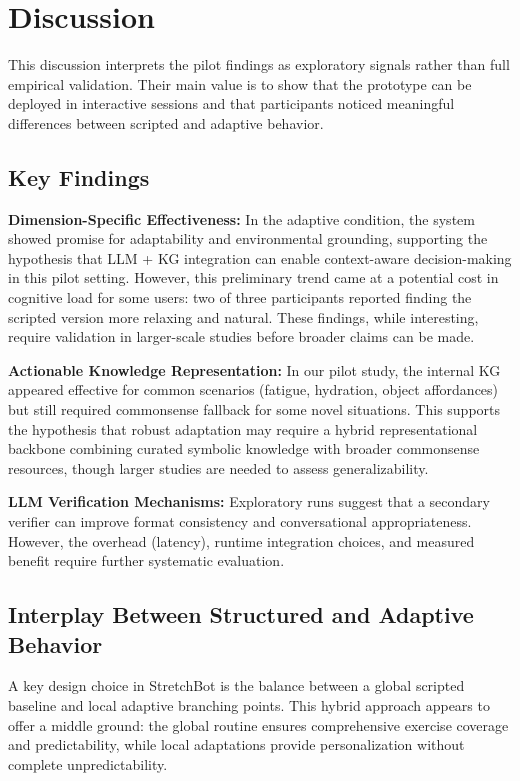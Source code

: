 \documentclass[pdflatex,sn-basic,Numbered,iicol,twocolumn]{sn-jnl}%
\begin{document}
\section{Discussion}
\label{sec:discussion}

This discussion interprets the pilot findings as exploratory signals rather than full empirical validation. Their main value is to show that the prototype can be deployed in interactive sessions and that participants noticed meaningful differences between scripted and adaptive behavior.

\subsection{Key Findings}

\textbf{Dimension-Specific Effectiveness:} In the adaptive condition, the system showed promise for adaptability and environmental grounding, supporting the hypothesis that LLM + KG integration can enable context-aware decision-making in this pilot setting. However, this preliminary trend came at a potential cost in cognitive load for some users: two of three participants reported finding the scripted version more relaxing and natural. These findings, while interesting, require validation in larger-scale studies before broader claims can be made.

\textbf{Actionable Knowledge Representation:} In our pilot study, the internal KG appeared effective for common scenarios (fatigue, hydration, object affordances) but still required commonsense fallback for some novel situations. This supports the hypothesis that robust adaptation may require a hybrid representational backbone combining curated symbolic knowledge with broader commonsense resources, though larger studies are needed to assess generalizability.

\textbf{LLM Verification Mechanisms:} Exploratory runs suggest that a secondary verifier can improve format consistency and conversational appropriateness. However, the overhead (latency), runtime integration choices, and measured benefit require further systematic evaluation.

\subsection{Interplay Between Structured and Adaptive Behavior}

A key design choice in StretchBot is the balance between a global scripted baseline and local adaptive branching points. This hybrid approach appears to offer a middle ground: the global routine ensures comprehensive exercise coverage and predictability, while local adaptations provide personalization without complete unpredictability.
\end{document}

